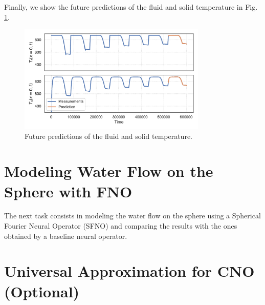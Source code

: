 \documentclass[unicode,11pt,a4paper,oneside,numbers=endperiod,openany]{scrartcl}
\begin{document}
Finally, we show the future predictions of the fluid and solid temperature in
Fig. \ref{fig:future}.
\begin{figure}[ht!]
    \centering
    \includegraphics[width=0.8\textwidth]{../task1/fno/plot_complete.pdf}
    \caption{Future predictions of the fluid and solid temperature.}
    \label{fig:future}
\end{figure}

\section{Modeling Water Flow on the Sphere with FNO}\label{sec:task2}
The next task consists in modeling the water flow on the sphere using a
Spherical
Fourier Neural Operator (SFNO) and comparing the results with the ones obtained
by a baseline neural operator.


\section{Universal Approximation for CNO (Optional)}\label{sec:task3}



\end{document}
